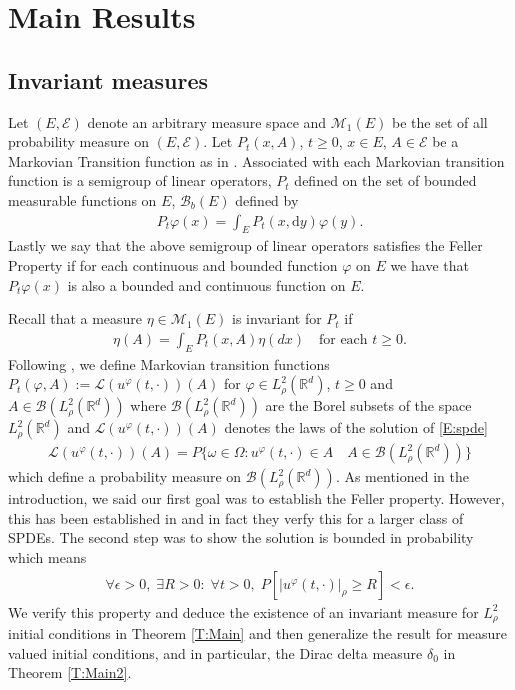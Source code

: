 \documentclass[a4paper,11pt]{article}
\numberwithin{equation}{section}
\theoremstyle{plain}
\theoremstyle{definition}
\newcommand{\R}{\mathbb{R}}
\newcommand{\ud}{\ensuremath{\mathrm{d}}}
\begin{document}
\section{Main Results}
\subsection{Invariant measures} 
Let $(E, \mathscr E)$ denote an arbitrary measure space and $\mathcal M_1(E)$ be the set of all probability measure on $(E, \mathscr E)$. Let $P_t(x,A)$, $t\ge0$, $x\in E$, $A \in \mathscr E$ be a Markovian Transition function as in \cite{DZ96}. Associated with each Markovian transition function is a semigroup of linear operators, $P_t$ defined on the set of bounded measurable functions on $E$, $\mathcal B_b(E)$ defined by  
\begin{align*}
	P_t \varphi (x) = \int_E P_t(x,\ud y)\varphi(y). 
\end{align*}
Lastly we say that the above semigroup of linear operators satisfies the Feller Property if for each continuous and bounded function $\varphi$ on $E$ we have that $P_t\varphi (x)$ is also a bounded and continuous function on $E$.  

Recall that a measure $\eta \in \mathcal M_1(E)$ is invariant for $P_t$ if 
\begin{align*}
	\eta(A)=\int_E P_t(x,A)\eta(dx) \quad \text{for each $t\ge 0$}.    
\end{align*}
Following \cite{DZ96}, we define Markovian transition functions $P_t(\varphi,A) := \mathscr L (u^\varphi(t,\cdot))(A)$ for $\varphi \in L^2_{\rho}(\R^d)$, $t \ge 0$ and $A \in \mathscr B (L^2_{\rho}(\R^d))$ where $\mathscr B (L^2_\rho(\R^d))$ are the Borel subsets of the space $L^2_\rho(\R^d)$ and $\mathscr L (u^\varphi(t,\cdot))(A)$ denotes the laws of the solution of \eqref{E:spde} 
\begin{align*}
	\mathscr L (u^\varphi(t,\cdot))(A) = P\{\omega \in \Omega : u^\varphi(t,\cdot) \in A \quad A \in \mathscr B(L^2_\rho(\R^d))\}  
\end{align*}
which define a probability measure on $\mathscr B(L^2_\rho(\R^d))$. As mentioned in the introduction, we said our first goal was to establish the Feller property. However, this has been established in \cite{DZ96} and in fact they verfy this for a larger class of SPDEs. The second step was to show the solution is bounded in probability which means 
\begin{align*}
	\forall \epsilon >0, \; \exists R>0: \; \forall t>0, \; P[|u^\varphi(t,\cdot)|_\rho \ge R] <  \epsilon . 
\end{align*}
We verify this property and deduce the existence of an invariant measure for $L^2_\rho$ initial conditions in Theorem
\ref{T:Main} and then generalize the result for measure valued initial conditions, and in particular, the Dirac delta
measure $\delta_0$ in Theorem \ref{T:Main2}.
\end{document}
